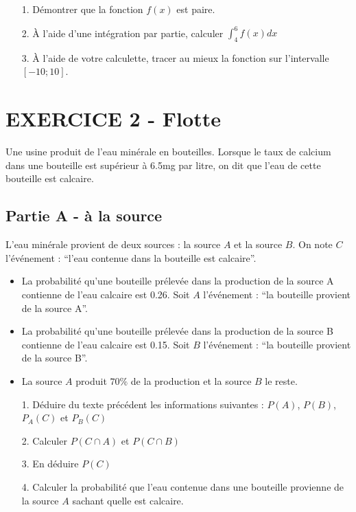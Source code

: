 \documentclass[12pt]{article}
\begin{document}
\begin{enumerate}
\item[1.] Démontrer que la fonction $f(x)$ est paire.
\item[2.] À l'aide d'une intégration par partie, calculer $\int_{4}^{6} f(x) dx$
\item[3.] À l'aide de votre calculette, tracer au mieux la fonction sur l'intervalle $[-10 ; 10]$.
\end{enumerate}

\begin{figure}[H]
  \centering
\end{figure}

\newpage
\section*{EXERCICE 2 - Flotte} %
Une usine produit de l'eau minérale en bouteilles. Lorsque le taux de calcium  dans une bouteille est supérieur à 6.5mg par litre, on dit que l'eau de cette bouteille est calcaire.

\subsection*{Partie A - à la source}

L'eau minérale provient de deux sources : la source $A$ et la source $B$. On note $C$ l'événement : ``l'eau contenue dans la bouteille est calcaire''.

\begin{itemize}
\item La probabilité qu'une bouteille prélevée dans la production de la source A contienne de l'eau calcaire est 0.26. Soit $A$ l'événement : ``la bouteille provient de la source A''.
\item La probabilité qu'une bouteille prélevée dans la production de la source B contienne de l'eau calcaire est 0.15. Soit $B$ l'événement : ``la bouteille provient de la source B''.
\item La source $A$ produit $70\%$ de la production et la source $B$ le reste.
\end{itemize}

\begin{enumerate}
\item[1.]  Déduire du texte précédent les informations suivantes : $P(A)$, $P(B)$,  $P_A(C)$ et  $P_B(C)$
\item[2.] Calculer $P(C \cap A)$ et $P(C \cap B)$
\item[3.] En déduire $P(C)$
\item[4.] Calculer la probabilité que l'eau contenue dans une bouteille provienne de la source $A$ sachant quelle est calcaire.
\end{enumerate}
\end{document}
